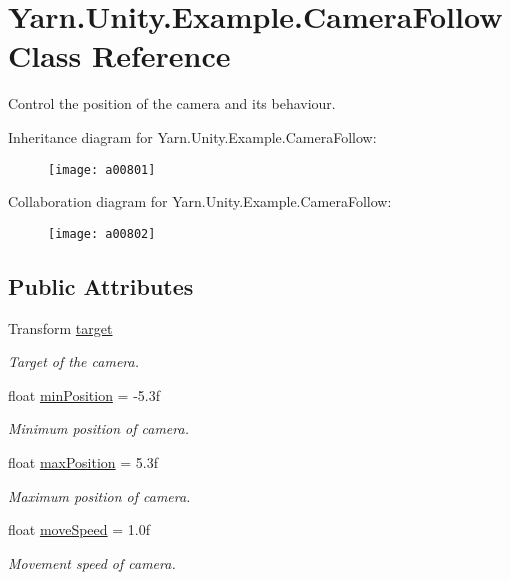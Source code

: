 \hypertarget{a00047}{\section{Yarn.\-Unity.\-Example.\-Camera\-Follow Class Reference}
\label{a00047}
}


Control the position of the camera and its behaviour.  




Inheritance diagram for Yarn.\-Unity.\-Example.\-Camera\-Follow\-:
\nopagebreak
\begin{figure}[H]
\begin{center}
\leavevmode
\texttt{[image: a00801]}
\end{center}
\end{figure}


Collaboration diagram for Yarn.\-Unity.\-Example.\-Camera\-Follow\-:
\nopagebreak
\begin{figure}[H]
\begin{center}
\leavevmode
\texttt{[image: a00802]}
\end{center}
\end{figure}
\subsection*{Public Attributes}
\begin{DoxyCompactItemize}
\item 
Transform \hyperlink{a00047_aa5d6958fb14a14ebb74e21c372fcca8b}{target}
\begin{DoxyCompactList}\small\item\em Target of the camera. \end{DoxyCompactList}\item 
float \hyperlink{a00047_a08c6f6c0ea423c21af99e4b5467d3c9b}{min\-Position} = -\/5.\-3f
\begin{DoxyCompactList}\small\item\em Minimum position of camera. \end{DoxyCompactList}\item 
float \hyperlink{a00047_abb0154dcbc2a7d43795beacd61a56de4}{max\-Position} = 5.\-3f
\begin{DoxyCompactList}\small\item\em Maximum position of camera. \end{DoxyCompactList}\item 
float \hyperlink{a00047_a3d4f2efe9c2cee8c7ff797cac03f27ec}{move\-Speed} = 1.\-0f
\begin{DoxyCompactList}\small\item\em Movement speed of camera. \end{DoxyCompactList}\end{DoxyCompactItemize}
